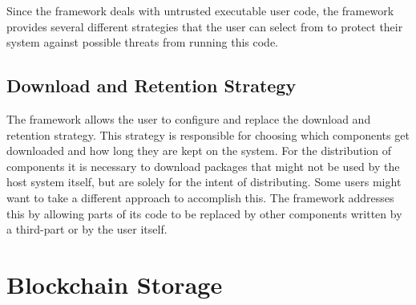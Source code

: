 Since the framework deals with untrusted executable user code, the framework provides several different strategies that the user can select from to protect their system against possible threats from running this code.

\subsection{Download and Retention Strategy}

The framework allows the user to configure and replace the download and retention strategy. This strategy is responsible for choosing which components get downloaded and how long they are kept on the system. For the distribution of components it is necessary to download packages that might not be used by the host system itself, but are solely for the intent of distributing. Some users might want to take a different approach to accomplish this. The framework addresses this by allowing parts of its code to be replaced by other components written by a third-part or by the user itself.

\section{Blockchain Storage}


